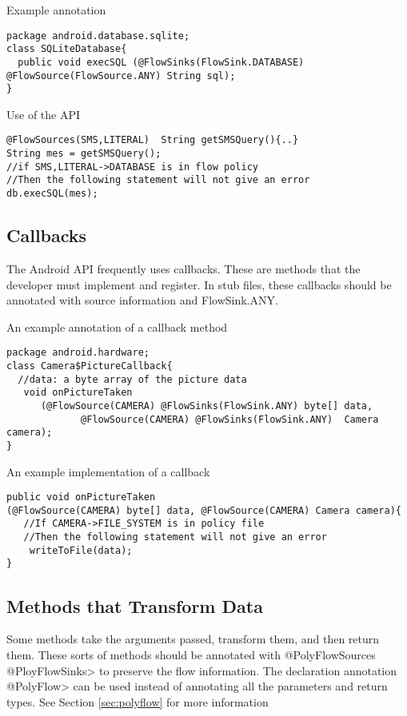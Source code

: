 Example annotation
\begin{Verbatim}
package android.database.sqlite;
class SQLiteDatabase{
  public void execSQL (@FlowSinks(FlowSink.DATABASE) @FlowSource(FlowSource.ANY) String sql);
}
\end{Verbatim}
Use of the API
\begin{Verbatim}
@FlowSources(SMS,LITERAL)  String getSMSQuery(){..}
String mes = getSMSQuery();
//if SMS,LITERAL->DATABASE is in flow policy
//Then the following statement will not give an error
db.execSQL(mes);
\end{Verbatim}

\subsection{Callbacks}
The Android API frequently uses callbacks.  These are methods that the developer must 
implement and register.  In stub files, these callbacks should be annotated
with source information and FlowSink.ANY.  

An example annotation of a callback method
\begin{Verbatim}
package android.hardware;
class Camera$PictureCallback{
  //data: a byte array of the picture data
   void onPictureTaken 
      (@FlowSource(CAMERA) @FlowSinks(FlowSink.ANY) byte[] data, 
             @FlowSource(CAMERA) @FlowSinks(FlowSink.ANY)  Camera camera);
}
\end{Verbatim}

An example implementation of a callback
\begin{Verbatim}
public void onPictureTaken
(@FlowSource(CAMERA) byte[] data, @FlowSource(CAMERA) Camera camera){
   //If CAMERA->FILE_SYSTEM is in policy file
   //Then the following statement will not give an error
    writeToFile(data);
}
\end{Verbatim}


\subsection{Methods that Transform Data}

Some methods take the arguments passed, transform them, and then return them.  These sorts of 
methods should be annotated with \<@PolyFlowSources @PloyFlowSinks>
  to preserve the flow information.  The declaration annotation \<@PolyFlow> can be used instead of
  annotating all the parameters and return types. See Section \ref{sec:polyflow} for more information 
  
